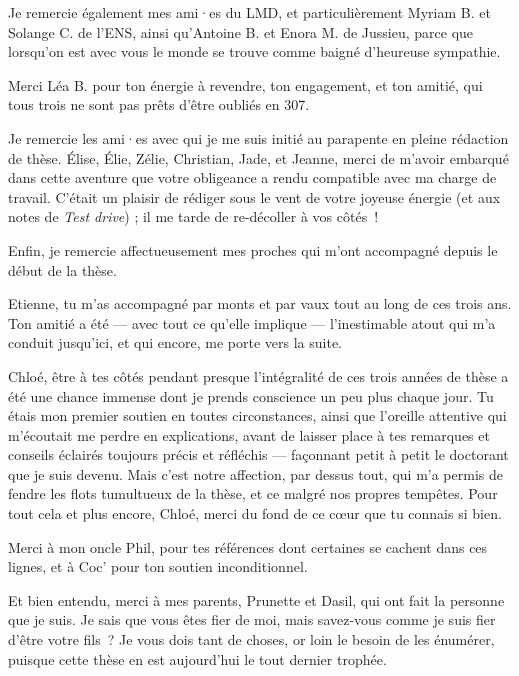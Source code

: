 {\noindent
Je remercie également mes ami·es du LMD, et particulièrement Myriam B. et Solange C. de l'ENS, ainsi qu'Antoine B. et Enora M. de Jussieu, parce que lorsqu'on est avec vous le monde se trouve comme baigné d'heureuse sympathie. %

\noindent
Merci Léa B. pour ton énergie à revendre, ton engagement, et ton amitié, qui tous trois ne sont pas prêts d'être oubliés en 307.
\vspace{1em}

Je remercie les ami·es avec qui je me suis initié au parapente en pleine rédaction de thèse. Élise, Élie, Zélie, Christian, Jade, et Jeanne, merci de m'avoir embarqué dans cette aventure que votre obligeance a rendu compatible avec ma charge de travail. C'était un plaisir de rédiger sous le vent de votre joyeuse énergie (et aux notes de \emph{Test drive}) ; il me tarde de re-décoller à vos côtés~!
\vspace{1em}

Enfin, je remercie affectueusement mes proches qui m'ont accompagné depuis le début de la thèse.

\noindent
Etienne, tu m'as accompagné par monts et par vaux tout au long de ces trois ans. Ton amitié a été --- avec tout ce qu'elle implique --- l'inestimable atout qui m'a conduit jusqu'ici, et qui encore, me porte vers la suite.
\vspace{1em}

Chloé, être à tes côtés pendant presque l'intégralité de ces trois années de thèse a été une chance immense dont je prends conscience un peu plus chaque jour. Tu étais mon premier soutien en toutes circonstances, ainsi que l'oreille attentive qui m'écoutait me perdre en explications, avant de laisser place à tes remarques et conseils éclairés toujours précis et réfléchis --- façonnant petit à petit le doctorant que je suis devenu. 
Mais c'est notre affection, par dessus tout, qui m'a permis de fendre les flots tumultueux de la thèse, et ce malgré nos propres tempêtes.  
Pour tout cela et plus encore, Chloé, merci du fond de ce c\oe ur que tu connais si bien. 
\vspace{1em}

Merci à mon oncle Phil, pour tes références dont certaines se cachent dans ces lignes, et à Coc' pour ton soutien inconditionnel.

\noindent
Et bien entendu, merci à mes parents, Prunette et Dasil, qui ont fait la personne que je suis. 
Je sais que vous êtes fier de moi, mais savez-vous comme je suis fier d'être votre fils~? Je vous dois tant de choses, or loin le besoin de les énumérer, puisque cette thèse en est aujourd'hui le tout dernier trophée.

\newpage
\thispagestyle{empty}
\mbox{}
\newpage
}
